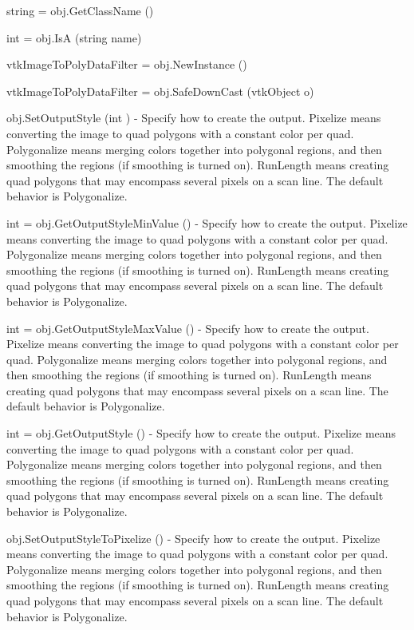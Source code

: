 \begin{DoxyItemize}
\item {\ttfamily string = obj.\-Get\-Class\-Name ()}  
\item {\ttfamily int = obj.\-Is\-A (string name)}  
\item {\ttfamily vtk\-Image\-To\-Poly\-Data\-Filter = obj.\-New\-Instance ()}  
\item {\ttfamily vtk\-Image\-To\-Poly\-Data\-Filter = obj.\-Safe\-Down\-Cast (vtk\-Object o)}  
\item {\ttfamily obj.\-Set\-Output\-Style (int )} -\/ Specify how to create the output. Pixelize means converting the image to quad polygons with a constant color per quad. Polygonalize means merging colors together into polygonal regions, and then smoothing the regions (if smoothing is turned on). Run\-Length means creating quad polygons that may encompass several pixels on a scan line. The default behavior is Polygonalize.  
\item {\ttfamily int = obj.\-Get\-Output\-Style\-Min\-Value ()} -\/ Specify how to create the output. Pixelize means converting the image to quad polygons with a constant color per quad. Polygonalize means merging colors together into polygonal regions, and then smoothing the regions (if smoothing is turned on). Run\-Length means creating quad polygons that may encompass several pixels on a scan line. The default behavior is Polygonalize.  
\item {\ttfamily int = obj.\-Get\-Output\-Style\-Max\-Value ()} -\/ Specify how to create the output. Pixelize means converting the image to quad polygons with a constant color per quad. Polygonalize means merging colors together into polygonal regions, and then smoothing the regions (if smoothing is turned on). Run\-Length means creating quad polygons that may encompass several pixels on a scan line. The default behavior is Polygonalize.  
\item {\ttfamily int = obj.\-Get\-Output\-Style ()} -\/ Specify how to create the output. Pixelize means converting the image to quad polygons with a constant color per quad. Polygonalize means merging colors together into polygonal regions, and then smoothing the regions (if smoothing is turned on). Run\-Length means creating quad polygons that may encompass several pixels on a scan line. The default behavior is Polygonalize.  
\item {\ttfamily obj.\-Set\-Output\-Style\-To\-Pixelize ()} -\/ Specify how to create the output. Pixelize means converting the image to quad polygons with a constant color per quad. Polygonalize means merging colors together into polygonal regions, and then smoothing the regions (if smoothing is turned on). Run\-Length means creating quad polygons that may encompass several pixels on a scan line. The default behavior is Polygonalize.  

\end{DoxyItemize}
